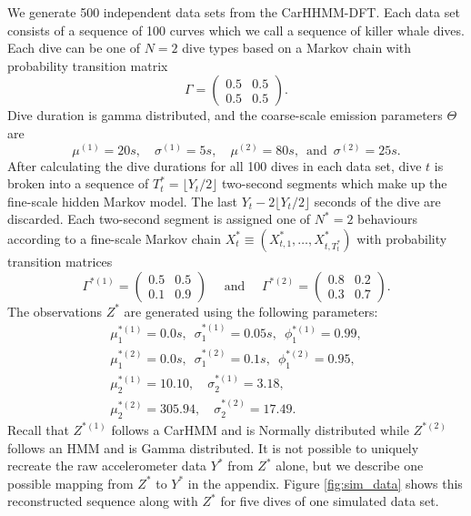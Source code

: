 We generate 500 independent data sets from the CarHHMM-DFT. Each data set consists of a sequence of 100 curves which we call a sequence of killer whale dives. Each dive can be one of $N=2$ dive types based on a Markov chain with probability transition matrix
%
$$\Gamma = \begin{pmatrix} 0.5 & 0.5 \\ 0.5 & 0.5 \end{pmatrix}.$$
%
Dive duration is gamma distributed, and the coarse-scale emission parameters $\Theta$ are
$$
    \mu^{(1)} = 20s, \quad \sigma^{(1)} = 5s, \quad
    \mu^{(2)} = 80s, \enspace \text{and} \enspace \sigma^{(2)} = 25s.
$$
%
After calculating the dive durations for all 100 dives in each data set, dive $t$ is broken into a sequence of $T^*_t = \lfloor Y_t/2 \rfloor$ two-second segments which make up the fine-scale hidden Markov model. The last $Y_t - 2\lfloor Y_t/2 \rfloor$ seconds of the dive are discarded. Each two-second segment is assigned one of $N^*=2$ behaviours according to a fine-scale Markov chain $X^*_t \equiv \left(X^*_{t,1}, \ldots, X^*_{t,T^*_t} \right)$ with probability transition matrices
%
$$\Gamma^{*(1)} = \begin{pmatrix} 0.5 & 0.5 \\ 0.1 & 0.9 \end{pmatrix} \quad \text{ and } \quad \Gamma^{*(2)} = \begin{pmatrix} 0.8 & 0.2 \\ 0.3 & 0.7 \end{pmatrix}.$$ 
%
The observations $Z^*$ are generated using the following parameters:
%
\begin{gather*}
    \mu_1^{*(1)} = 0.0 s, \enspace \sigma_1^{*(1)} = 0.05s, \enspace \phi_1^{*(1)} = 0.99, \\
    \mu_1^{*(2)} = 0.0 s, \enspace \sigma_1^{*(2)} = 0.1s, \enspace \phi_1^{*(2)} = 0.95, \\
    \mu_2^{*(1)} = 10.10, \quad \sigma_2^{*(1)} = 3.18, \\
    \mu_2^{*(2)} = 305.94, \quad \sigma_2^{*(2)} = 17.49.
\end{gather*}
%
Recall that $Z^{*(1)}$ follows a CarHMM and is Normally distributed while $Z^{*(2)}$ follows an HMM and is Gamma distributed. It is not possible to uniquely recreate the raw accelerometer data $Y^*$ from $Z^*$ alone, but we describe one possible mapping from $Z^*$ to $Y^*$ in the appendix. Figure \ref{fig:sim_data} shows this reconstructed sequence along with $Z^*$ for five dives of one simulated data set. 

